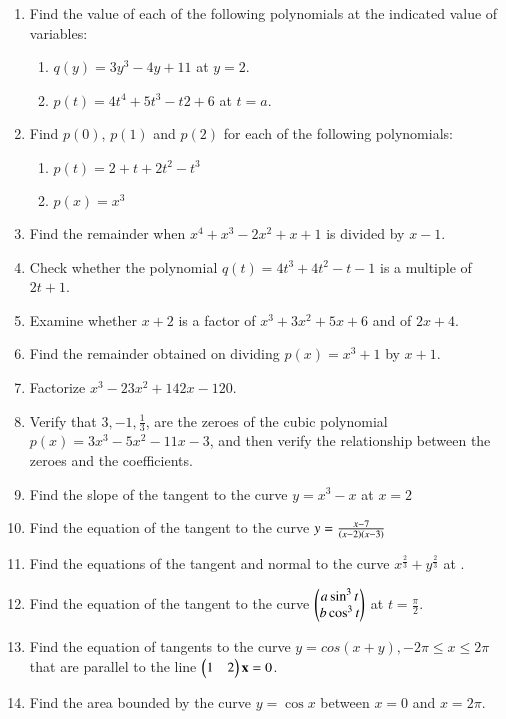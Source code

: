 \renewcommand{\theequation}{\theenumi}
\begin{enumerate}[label=\arabic*.,ref=\thesubsection.\theenumi]
%
\item Find the value of each of the following polynomials at the indicated value of variables: 
\begin{enumerate}
\item  $q(y) = 3y^3 - 4y + 11$ at $y = 2. $
\item  $p(t) = 4t^4+ 5t^3 - t2 + 6$ at $t = a.$
\end{enumerate}
%
\item Find $p(0)$, $p(1)$ and $p(2)$ for each of the following polynomials: 
\begin{enumerate}
\item  $p(t) = 2 + t + 2t^2 - t^3 $
\item $ p(x) = x^3$
\end{enumerate}
%
\item Find the remainder when $x^4+x^3-2x^2+x+1$ is divided by $x-1$.
%
\item Check whether the polynomial $q(t) = 4t^3+4t^2-t-1$ is a multiple of $2t+1$.
\item Examine whether $x + 2$ is a factor of $x^3 + 3x^2 + 5x + 6$ and of $2x + 4$.
\item Find the remainder obtained on dividing $p(x) = x^3+1 $ by $x+1$.
\item Factorize $x^3 - 23x^2 + 142x -120$.
\item Verify that $3, -1, \frac{1}{ 3}$, are the zeroes of the cubic polynomial $p(x) = 3x^3 - 5x^2 - 11x - 3$, and then verify the relationship between the zeroes and the coefficients.
%
\item Find the slope of the tangent to the curve $y = x^3 - x$ at $x = 2$
%
\item Find the equation of the tangent to the curve 
$
y = \frac{x-7}{\left(x-2\right)\left(x-3\right)}
$
%
\item Find the equations of the tangent and normal to the curve 
$
x^{\frac{2}{3}}+y^{\frac{2}{3}} 
$
at .
\item Find the equation of the tangent to the curve 
$
\begin{pmatrix}a \sin^3 t\\b\cos^3t\end{pmatrix}
$
at $t = \frac{\pi}{2}$.
\item Find the equation of tangents to the curve $y = cos (x + y), - 2\pi \le x \le 2\pi$
that are parallel to the line $\begin{pmatrix}1 & 2\end{pmatrix}\mathbf{x}= 0$.
%
\item Find the area bounded by the curve $y = \cos x $ between $x = 0$ and $x = 2\pi$.

\end{enumerate}

